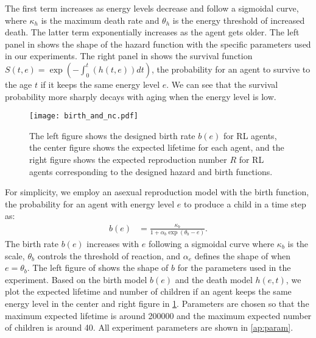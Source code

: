 The first term increases as energy levels decrease and follow a sigmoidal curve, where $\kappa_{h}$ is the maximum death rate and $\theta_h$ is the energy threshold of increased death. %
The latter term %
exponentially increases as the agent gets older.
The left panel in  shows the shape of the hazard function with the specific parameters used in our experiments. 
The right panel in  shows the
survival function $S(t, e) = \exp (-\int_{0}^{t}(h(t, e)) dt)$, the probability for an agent to survive to the age $t$ if it keeps the same energy level $e$. 
We can see that the survival probability more sharply decays with aging when the energy level is low.

\begin{figure}[t]
  \centering{}
  \texttt{[image: birth\_and\_nc.pdf]}
  \caption{
    The left figure shows the designed birth rate $b(e)$ for RL agents, the center figure shows the expected lifetime for each agent, and the right figure shows the expected reproduction number $R$ for RL agents corresponding to the designed hazard and birth functions.
  }\label{figure:bnc}
\end{figure}

For simplicity, we employ an asexual reproduction model 
with the birth function, the probability for an agent with energy level $e$ to produce a child in a time step as:
\begin{align}
 b(e) &= \frac{\kappa_{b}}{1 + \alpha_{b}\exp(\theta_{b} - e)}. 
 \label{eq:b}
\end{align}
The birth rate $b(e)$ increases with $e$ following a sigmoidal curve where $\kappa_{b}$ is the scale, $\theta_{b}$ controls the threshold of reaction, and $\alpha_{e}$ defines the shape of when $e = \theta_{b}$. 
The left figure of  shows the shape of $b$ for the parameters used in the experiment. 
Based on the birth model $b(e)$ and the death model $h(e,t)$, we plot the expected lifetime and number of children if an agent keeps the same energy level in the center and right figure in \cref{figure:bnc}. Parameters are chosen so that the maximum expected lifetime is around \num{200000} and the maximum expected number of children is around 40. All experiment parameters are shown in \cref{ap:param}.

